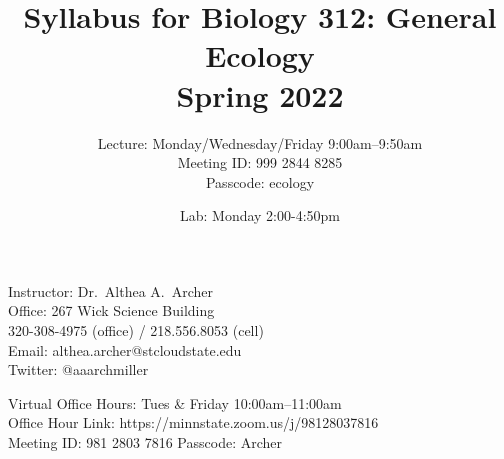 \documentclass{tufte-handout}
\title{Syllabus for Biology 312: General Ecology \\ 
Spring 2022}										%
\author{Lecture: Monday/Wednesday/Friday 9:00am--9:50am \\
Meeting ID: \color{red} 999 2844 8285 \color{black} \\
Passcode: \color{red} ecology \color{black}}								%
\date{Lab: Monday 2:00-4:50pm}
\begin{document}
\maketitle

Instructor: Dr.~Althea A.~Archer\\
Office: 267 Wick Science Building\\
320-308-4975 (office) / 218.556.8053 (cell)\\
Email: althea.archer@stcloudstate.edu\\
Twitter: @aaarchmiller

\color{gray} Virtual Office Hours: Tues \& Friday 10:00am--11:00am \\
Office Hour Link: https://minnstate.zoom.us/j/98128037816\\
Meeting ID: 981 2803 7816 Passcode: Archer \color{black}
\end{document}
